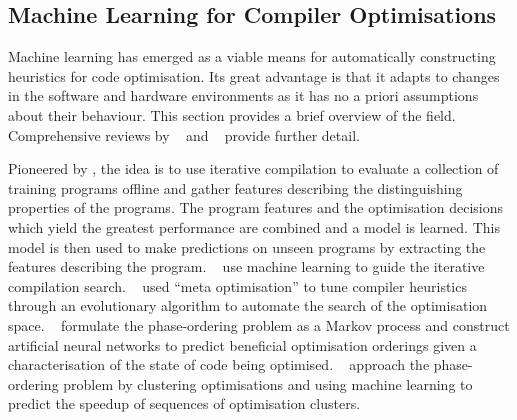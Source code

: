\subsection{Machine Learning for Compiler Optimisations}
\label{subsec:related-work-machine-learning-optimisation}

Machine learning has emerged as a viable means for automatically constructing heuristics for code optimisation. Its great advantage is that it adapts to changes in the software and hardware environments as it has no a priori assumptions about their behaviour.
This section provides a brief overview of the field. Comprehensive reviews by \citeauthor{Ashouri2018}~\cite{Ashouri2018} and
\citeauthor{Zhang2018}~\cite{Zhang2018} provide further detail.

Pioneered by \citeauthor{Agakov}, the idea is to use iterative compilation to evaluate a collection of training programs offline and gather features describing the distinguishing properties of the programs. The program features and the optimisation decisions which yield the greatest performance are combined and a model is learned. This model is then used to make predictions on unseen programs by extracting the features describing the program. \citeauthor{Agakov}~\cite{Agakov} use machine learning to guide the iterative compilation search.
\citeauthor{Stephenson2003}~\cite{Stephenson2003} used ``meta optimisation'' to tune compiler heuristics through an evolutionary algorithm to automate the search of the optimisation space.
\citeauthor{Kulkarni2012}~\cite{Kulkarni2012} formulate the phase-ordering problem as a Markov process and construct artificial neural networks to predict beneficial optimisation orderings given a characterisation of the state of code being optimised.
\citeauthor{Ashouri2017}~\cite{Ashouri2017} approach the phase-ordering problem by clustering optimisations and using machine learning to predict the speedup of sequences of optimisation clusters.

